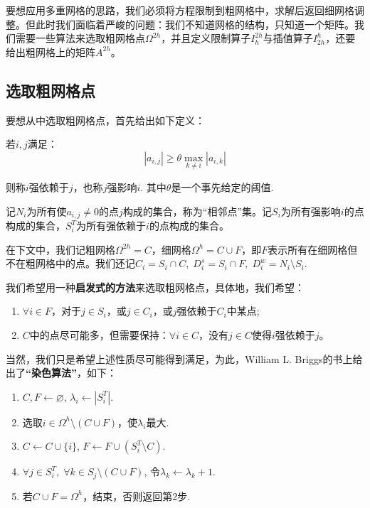 \documentclass[lang=cn,10pt]{elegantbook}
\begin{document}
要想应用多重网格的思路，我们必须将方程限制到粗网格中，求解后返回细网格调整。但此时我们面临着严峻的问题：我们不知道网格的结构，只知道一个矩阵。我们需要一些算法来选取粗网格点$\Omega^{2h}$，并且定义限制算子$I_{h}^{2h}$与插值算子$I_{2h}^{h}$，还要给出粗网格上的矩阵$A^{2h}$。

\subsection{选取粗网格点}

要想从中选取粗网格点，首先给出如下定义：

\begin{definition}
  若$i,j$满足：
  \begin{equation}
    |a_{i,j}|\geq \theta\max_{k\neq i}|a_{i,k}|
  \end{equation}

  则称$i$强依赖于$j$，也称$j$强影响$i$. 其中$\theta$是一个事先给定的阈值.

  记$N_i$为所有使$a_{i,j}\neq 0$的点$j$构成的集合，称为“相邻点”集。记$S_i$为所有强影响$i$的点构成的集合，$S_i^T$为所有强依赖于$i$的点构成的集合。
\end{definition}

在下文中，我们记粗网格$\Omega^{2h}=C$，细网格$\Omega^h=C\cup F$，即$F$表示所有在细网格但不在粗网格中的点。我们还记$C_i=S_i\cap C,\;D_i^s=S_i\cap F,\;D_i^w=N_i\setminus S_i$.

我们希望用一种\textbf{启发式的方法}来选取粗网格点，具体地，我们希望：
\begin{enumerate}[(1)]
  \item $\forall i\in F$，对于$j\in S_i$，或$j\in C_i$，或$j$强依赖于$C_i$中某点;
  \item $C$中的点尽可能多，但需要保持：$\forall i\in C$，没有$j\in C$使得$i$强依赖于$j$。
\end{enumerate}

当然，我们只是希望上述性质尽可能得到满足，为此，William L. Briggs的书上给出了\textbf{“染色算法”}，如下：
\begin{enumerate}[1]
  \item $C,F\gets \varnothing$, $\lambda_i\gets |S_i^T|$.
  \item 选取$i\in\Omega^h\setminus(C\cup F)$，使$\lambda_i$最大.
  \item $C\gets C\cup\{i\}$, $F\gets F\cup (S_i^T\setminus C)$.
  \item $\forall j\in S_i^T,\;\forall k\in S_j\setminus(C\cup F)$, 令$\lambda_k\gets \lambda_k+1$.
  \item 若$C\cup F=\Omega^h$，结束，否则返回第2步.
\end{enumerate}
\end{document}
